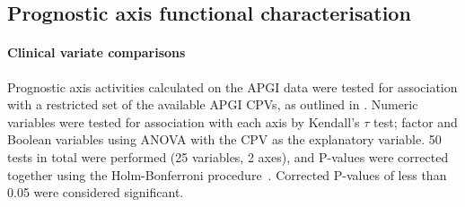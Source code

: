 \documentclass[dissertation.tex]{subfiles}
\begin{document}
\subsection{Prognostic axis functional characterisation}
\paragraph{Clinical variate comparisons}
Prognostic axis activities calculated on the \gls{APGI} data were tested for association with a restricted set of the available \gls{APGI} \glspl{CPV}, as outlined in .  Numeric variables were tested for association with each axis by Kendall's $\tau$ test; factor and Boolean variables using ANOVA with the \gls{CPV} as the explanatory variable.  50 tests in total were performed (25 variables, 2 axes), and P-values were corrected together using the Holm-Bonferroni procedure~\cite{Holm1979}.  Corrected P-values of less than 0.05 were considered significant.
\end{document}
